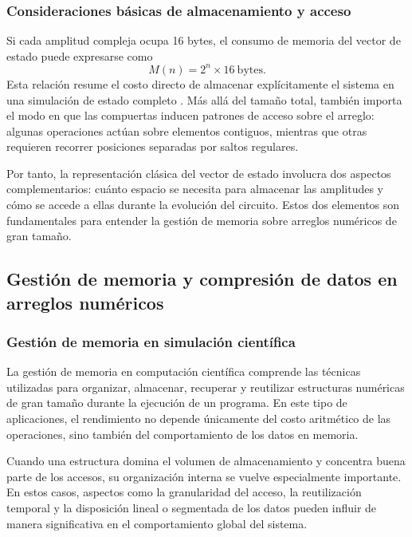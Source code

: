 \subsubsection{Consideraciones básicas de almacenamiento y acceso}

Si cada amplitud compleja ocupa 16 bytes, el consumo de memoria del vector de estado puede expresarse como
\[
    M(n)=2^n \times 16\ \text{bytes}.
\]
Esta relación resume el costo directo de almacenar explícitamente el sistema en una simulación de estado completo \cite{Jones2019,wu2019full}. Más allá del tamaño total, también importa el modo en que las compuertas inducen patrones de acceso sobre el arreglo: algunas operaciones actúan sobre elementos contiguos, mientras que otras requieren recorrer posiciones separadas por saltos regulares.

Por tanto, la representación clásica del vector de estado involucra dos aspectos complementarios: cuánto espacio se necesita para almacenar las amplitudes y cómo se accede a ellas durante la evolución del circuito. Estos dos elementos son fundamentales para entender la gestión de memoria sobre arreglos numéricos de gran tamaño.

\subsection{\normalsize{Gestión de memoria y compresión de datos en arreglos numéricos}}

\subsubsection{Gestión de memoria en simulación científica}

La gestión de memoria en computación científica comprende las técnicas utilizadas para organizar, almacenar, recuperar y reutilizar estructuras numéricas de gran tamaño durante la ejecución de un programa. En este tipo de aplicaciones, el rendimiento no depende únicamente del costo aritmético de las operaciones, sino también del comportamiento de los datos en memoria.

Cuando una estructura domina el volumen de almacenamiento y concentra buena parte de los accesos, su organización interna se vuelve especialmente importante. En estos casos, aspectos como la granularidad del acceso, la reutilización temporal y la disposición lineal o segmentada de los datos pueden influir de manera significativa en el comportamiento global del sistema.

